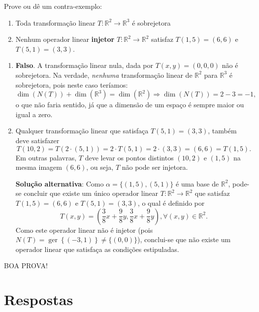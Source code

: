 \documentclass[12pt,a4paper]{article}
\newcommand*\ger[1]{\operatorname{ger}\left\{#1\right\}}
\newcommand*\R{\mathbb{R}}
\begin{document}
\begin{ExerciseList}
\Exercise[title={2,0}] Prove ou dê um contra-exemplo:
\begin{enumerate}
\item Toda transformação linear $T: \R^2 \to \R^3$ é sobrejetora
\item Nenhum operador linear \textbf{injetor} $T: \R^2 \to \R^2$ satisfaz $T(1,5)=(6,6)$ e $T(5,1) = (3,3)$.
\end{enumerate}
\Answer
\begin{enumerate}
\item \textbf{Falso}. A transformação linear nula, dada por $T(x,y) = (0,0,0)$ não é sobrejetora. Na verdade, \textit{nenhuma} transformação linear de $\R^2$ para $\R^3$ é sobrejetora, pois neste caso teríamos:
\[
\dim(N(T)) + \dim(\R^3) = \dim(\R^2) \Rightarrow \dim(N(T)) = 2 - 3 = -1,
\]
o que não faria sentido, já que a dimensão de um espaço é sempre maior ou igual a zero.
\item Qualquer transformação linear que satisfaça $T(5,1) = (3,3)$, também deve satisfazer
\[
T(10,2) = T(2\cdot (5,1)) = 2 \cdot T(5,1) = 2\cdot (3,3) = (6,6) = T(1,5).
\]
Em outras palavras, $T$ deve levar os pontos distintos $(10,2)$ e $(1,5)$ na mesma imagem $(6,6)$, ou seja, $T$ não pode ser injetora.

\textbf{Solução alternativa}: Como $\alpha = \{ (1, 5), (5, 1) \}$ é uma base de $\R^2$, pode-se concluir que existe um único operador linear $T: \R^2 \to \R^2$ que satisfaz $T(1,5)=(6,6)$ e $T(5,1) = (3,3)$, o qual é definido por
\[
T(x,y) = \left(\frac{3}{8}x+\frac{9}{8}y,\frac{3}{8}x+\frac{9}{8}y\right), \forall (x,y) \in \R^2.
\]
Como este operador linear não é injetor (pois $N(T) = \ger{(-3,1)} \neq \{ (0,0) \}$), conclui-se que não existe um operador linear que satisfaça as condições estipuladas.
\end{enumerate}
\end{ExerciseList}

\begin{center}
BOA PROVA!
\end{center}

\newpage
\restoregeometry
\section*{Respostas}
\shipoutAnswer
\end{document}
